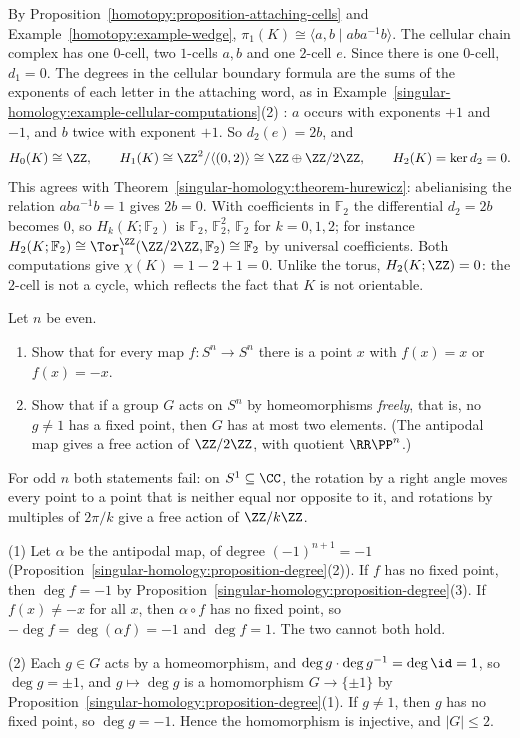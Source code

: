 \begin{solution}
By Proposition~\ref{homotopy:proposition-attaching-cells} and Example~\ref{homotopy:example-wedge}, $\pi_1(K) \cong \langle a, b \mid aba^{-1}b \rangle$. The cellular chain complex
has one $0$-cell, two $1$-cells $a, b$ and one $2$-cell $e$. Since there is one $0$-cell, $d_1 = 0$. The degrees in the cellular boundary formula are the sums of the
exponents of each letter in the attaching word, as in Example~\ref{singular-homology:example-cellular-computations}(2) \cite[Section 2.2]{hatcher-at}: $a$ occurs with
exponents $+1$ and $-1$, and $b$ twice with exponent $+1$. So $d_2(e) = 2b$, and
\[
H_0(K) \cong \ZZ, \qquad H_1(K) \cong \ZZ^2/\langle(0, 2)\rangle \cong \ZZ \oplus \ZZ/2\ZZ, \qquad H_2(K) = \ker d_2 = 0.
\]
This agrees with Theorem~\ref{singular-homology:theorem-hurewicz}: abelianising the relation $aba^{-1}b = 1$ gives $2b = 0$. With coefficients in $\mathbb{F}_2$ the differential
$d_2 = 2b$ becomes $0$, so $H_k(K; \mathbb{F}_2)$ is $\mathbb{F}_2$, $\mathbb{F}_2^2$, $\mathbb{F}_2$ for $k = 0, 1, 2$; for instance $H_2(K; \mathbb{F}_2) \cong \Tor_1^\ZZ(\ZZ/2\ZZ, \mathbb{F}_2) \cong \mathbb{F}_2$ by
universal coefficients. Both computations give $\chi(K) = 1 - 2 + 1 = 0$. Unlike the torus, $H_2(K; \ZZ) = 0$: the $2$-cell is not a cycle, which reflects the fact that $K$ is not
orientable.
\end{solution}

\begin{exercise}\label{singular-homology:exercise-free-actions}
Let $n$ be even.
\begin{enumerate}
\item Show that for every map $f \colon S^n \to S^n$ there is a point $x$ with $f(x) = x$ or $f(x) = -x$.
\item Show that if a group $G$ acts on $S^n$ by homeomorphisms \emph{freely}, that is, no $g \neq 1$ has a fixed point, then $G$ has at most two elements. (The
antipodal map gives a free action of $\ZZ/2\ZZ$, with quotient $\RR\PP^n$.)
\end{enumerate}
For odd $n$ both statements fail: on $S^1 \subseteq \CC$, the rotation by a right angle moves every point to a point that is neither equal nor opposite to it, and
rotations by multiples of $2\pi/k$ give a free action of $\ZZ/k\ZZ$.
\end{exercise}

\begin{solution}
(1) Let $\alpha$ be the antipodal map, of degree $(-1)^{n+1} = -1$ (Proposition~\ref{singular-homology:proposition-degree}(2)). If $f$ has no fixed point, then
$\deg f = -1$ by Proposition~\ref{singular-homology:proposition-degree}(3). If $f(x) \neq -x$ for all $x$, then $\alpha \circ f$ has no fixed point, so
$-\deg f = \deg(\alpha f) = -1$ and $\deg f = 1$. The two cannot both hold.

(2) Each $g \in G$ acts by a homeomorphism, and $\deg g \cdot \deg g^{-1} = \deg\id = 1$, so $\deg g = \pm1$, and $g \mapsto \deg g$ is a homomorphism $G \to \{\pm1\}$ by
Proposition~\ref{singular-homology:proposition-degree}(1). If $g \neq 1$, then $g$ has no fixed point, so $\deg g = -1$. Hence the homomorphism is injective, and $|G| \leq 2$.
\end{solution}

